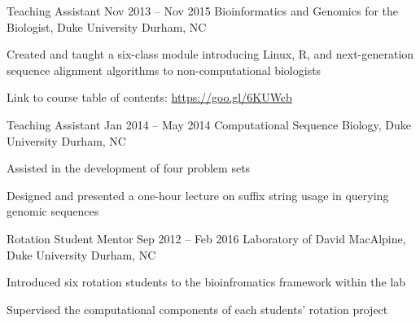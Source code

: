 

\begin{resentries}

  \resentry
    {Teaching Assistant} %
    {Nov 2013 -- Nov 2015} %
    {Bioinformatics and Genomics for the Biologist, Duke University} %
    {Durham, NC} %
    {
      \begin{cvitems} %
        \item{Created and taught a six-class module introducing Linux, R, and next-generation sequence alignment algorithms to non-computational biologists}
        \item{Link to course table of contents: \href{https://goo.gl/6KUWCb}{\color{blue} https://goo.gl/6KUWcb}}
      \end{cvitems}
    }

  \resentry
    {Teaching Assistant} %
    {Jan 2014 -- May 2014} %
    {Computational Sequence Biology, Duke University} %
    {Durham, NC} %
    {
      \begin{cvitems} %
        \item{Assisted in the development of four problem sets}
        \item{Designed and presented a one-hour lecture on suffix string usage in querying genomic sequences}
      \end{cvitems}
    }

  \resentry
    {Rotation Student Mentor} %
    {Sep 2012 -- Feb 2016} %
    {Laboratory of David MacAlpine, Duke University} %
    {Durham, NC} %
    {
      \begin{cvitems} %
        \item{Introduced six rotation students to the bioinfromatics framework within the lab}
        \item{Supervised the computational components of each students' rotation project}
      \end{cvitems}
    }

\end{resentries}
